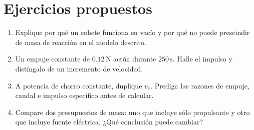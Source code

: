 \section{Ejercicios propuestos}
\begin{enumerate}
\item Explique por qué un cohete funciona en vacío y por qué no puede prescindir de masa de reacción en el modelo descrito.
\item Un empuje constante de $0.12\,\mathrm N$ actúa durante $250\,\mathrm s$. Halle el impulso y distíngalo de un incremento de velocidad.
\item A potencia de chorro constante, duplique $v_e$. Prediga las razones de empuje, caudal e impulso específico antes de calcular.
\item Compare dos presupuestos de masa: uno que incluye sólo propulsante y otro que incluye fuente eléctrica. ¿Qué conclusión puede cambiar?
\end{enumerate}


\studiumchaptercheck

